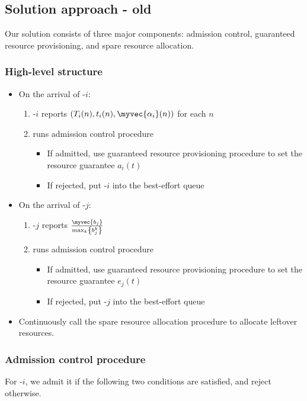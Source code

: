 \subsection{Solution approach - old}
\label{sec:solution_approach_old}

Our solution \name consists of three major components: admission control, guaranteed resource provisioning, and spare resource allocation. 

\subsubsection{High-level structure}

\begin{itemize}
\item On the arrival of \bursty-$i$:
	\begin{enumerate}
	\item \bursty-$i$ reports $\left(T_i(n), t_i(n), \myvec{\alpha_i}(n)\right)$ for each $n$
	\item \name runs admission control procedure
		\begin{itemize}
		\item If admitted, use guaranteed resource provisioning procedure to set the 				resource guarantee $a_i(t)$
		\item If rejected, put \bursty-$i$ into the best-effort queue
		\end{itemize}
	\end{enumerate}
\item On the arrival of \batch-$j$:
	\begin{enumerate}
	\item \batch-$j$ reports $\frac{\myvec{b_j}}{\max_k\left\{b^k_j\right\}}$
	\item \name runs admission control procedure
		\begin{itemize}
		\item If admitted, use guaranteed resource provisioning procedure to set the 				resource guarantee $e_j(t)$
		\item If rejected, put \batch-$j$ into the best-effort queue
		\end{itemize}
	\end{enumerate}
\item Continuously call the spare resource allocation procedure to allocate leftover resources.
\end{itemize}

\subsubsection{Admission control procedure}
For \bursty-$i$, we admit it if the following two conditions are satisfied, and reject otherwise.

